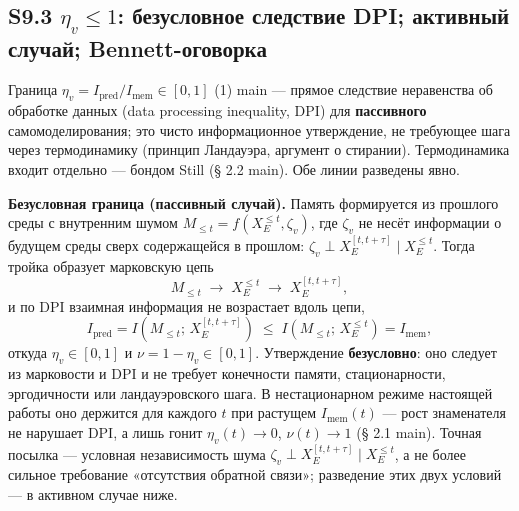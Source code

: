 \documentclass[pdflatex,sn-mathphys-ay]{sn-jnl}
\begin{document}
\subsection*{\texorpdfstring{S9.3 \(\eta_v \le 1\): безусловное следствие DPI; активный случай; Bennett-оговорка}{S9.3 \textbackslash eta\_v \textbackslash le 1: безусловное следствие DPI; активный случай; Bennett-оговорка}}\label{s9.3-eta_v-le-1-ux431ux435ux437ux443ux441ux43bux43eux432ux43dux43eux435-ux441ux43bux435ux434ux441ux442ux432ux438ux435-dpi-ux430ux43aux442ux438ux432ux43dux44bux439-ux441ux43bux443ux447ux430ux439-bennett-ux43eux433ux43eux432ux43eux440ux43aux430}



Граница \(\eta_v = I_{\text{pred}}/I_{\text{mem}} \in [0,1]\) (1) main --- прямое следствие неравенства об обработке данных (data processing inequality, DPI) для \textbf{пассивного} самомоделирования; это чисто информационное утверждение, не требующее шага через термодинамику (принцип Ландауэра, аргумент о стирании). Термодинамика входит отдельно --- бондом Still (§ 2.2 main). Обе линии разведены явно.



\textbf{Безусловная граница (пассивный случай).} Память формируется из прошлого среды с внутренним шумом \(M_{\le t} = f(X_E^{\le t}, \zeta_v)\), где \(\zeta_v\) не несёт информации о будущем среды сверх содержащейся в прошлом: \(\zeta_v \perp X_E^{[t,t+\tau]} \mid X_E^{\le t}\). Тогда тройка образует марковскую цепь \[M_{\le t} \;\to\; X_E^{\le t} \;\to\; X_E^{[t,t+\tau]},\] и по DPI взаимная информация не возрастает вдоль цепи, \[I_{\text{pred}} = I\!\left(M_{\le t};\, X_E^{[t,t+\tau]}\right) \;\le\; I\!\left(M_{\le t};\, X_E^{\le t}\right) = I_{\text{mem}},\] откуда \(\eta_v \in [0,1]\) и \(\nu = 1 - \eta_v \in [0,1]\). Утверждение \textbf{безусловно}: оно следует из марковости и DPI и не требует конечности памяти, стационарности, эргодичности или ландауэровского шага. В нестационарном режиме настоящей работы оно держится для каждого \(t\) при растущем \(I_{\text{mem}}(t)\) --- рост знаменателя не нарушает DPI, а лишь гонит \(\eta_v(t) \to 0\), \(\nu(t) \to 1\) (§ 2.1 main). Точная посылка --- условная независимость шума \(\zeta_v \perp X_E^{[t,t+\tau]} \mid X_E^{\le t}\), а не более сильное требование «отсутствия обратной связи»; разведение этих двух условий --- в активном случае ниже.
\end{document}
